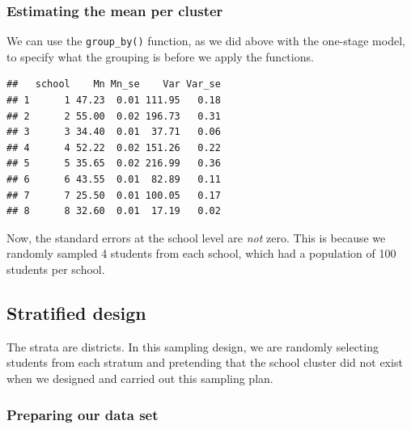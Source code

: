 \documentclass[
]{article}
\newenvironment{Shaded}{\begin{snugshade}}{\end{snugshade}}
\newcommand{\DataTypeTok}[1]{\textcolor[rgb]{0.13,0.29,0.53}{#1}}
\newcommand{\DecValTok}[1]{\textcolor[rgb]{0.00,0.00,0.81}{#1}}
\newcommand{\KeywordTok}[1]{\textcolor[rgb]{0.13,0.29,0.53}{\textbf{#1}}}
\newcommand{\NormalTok}[1]{#1}
\newcommand{\OperatorTok}[1]{\textcolor[rgb]{0.81,0.36,0.00}{\textbf{#1}}}
\newcommand{\StringTok}[1]{\textcolor[rgb]{0.31,0.60,0.02}{#1}}
\begin{document}
\hypertarget{estimating-the-mean-per-cluster-1}{%
\subsubsection{Estimating the mean per cluster}\label{estimating-the-mean-per-cluster-1}}

We can use the \texttt{group\_by()} function, as we did above with the one-stage model, to specify what the grouping is before we apply the functions.

\begin{Shaded}
\end{Shaded}

\begin{verbatim}
##   school    Mn Mn_se    Var Var_se
## 1      1 47.23  0.01 111.95   0.18
## 2      2 55.00  0.02 196.73   0.31
## 3      3 34.40  0.01  37.71   0.06
## 4      4 52.22  0.02 151.26   0.22
## 5      5 35.65  0.02 216.99   0.36
## 6      6 43.55  0.01  82.89   0.11
## 7      7 25.50  0.01 100.05   0.17
## 8      8 32.60  0.01  17.19   0.02
\end{verbatim}

Now, the standard errors at the school level are \emph{not} zero. This is because we randomly sampled 4 students from each school, which had a population of 100 students per school.

\hypertarget{stratified-design}{%
\subsection{Stratified design}\label{stratified-design}}

The strata are districts. In this sampling design, we are randomly selecting students from each stratum and pretending that the school cluster did not exist when we designed and carried out this sampling plan.

\hypertarget{preparing-our-data-set}{%
\subsubsection{Preparing our data set}\label{preparing-our-data-set}}
\end{document}
